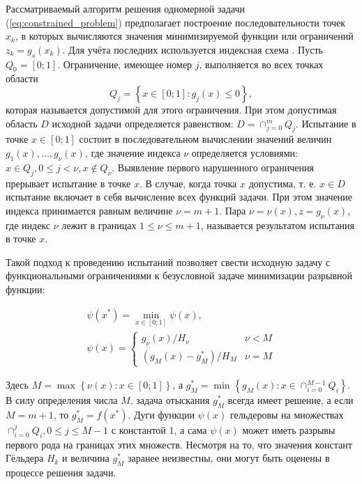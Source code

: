 Рассматриваемый алгоритм решения одномерной задачи (\ref{eq:constrained_problem}) предполагает построение последовательности
точек \(x_k\), в которых вычисляются значения минимизируемой функции или ограничений \(z_k = g_s(x_k)\).
Для учёта последних используется индексная схема \cite{strongSerg}. Пусть \(Q_0=[0;1]\). Ограничение, имеющее номер
 \(j\), выполняется во всех точках области
\begin{displaymath}
  Q_j=\left\{x\in [0;1]:g_j(x)\leq 0\right\},
\end{displaymath}
которая называется допустимой для этого ограничения. При этом допустимая область \(D\)
исходной задачи определяется равенством: \(D=\cap _{j=0}^{m}Q_{j}\).
Испытание в точке \(x\in [0;1]\) состоит в последовательном вычислении значений
величин \(g_{1}(x),...,g_{\nu }(x)\), где значение индекса \(\nu\) определяется условиями:
\(x\in Q_{j},0\leqslant j<\nu ,x\notin Q_{\nu }\). Выявление первого нарушенного ограничения
прерывает испытание в точке \(x\). В случае, когда точка \(x\)  допустима, т. е.
\(x\in D\) испытание включает в себя вычисление всех функций задачи. При этом значение
индекса принимается равным величине \(\nu =m+1\). Пара \(\nu =\nu (x),z=g_{\nu }(x)\),
где индекс \(\nu\) лежит в границах \(1\leqslant \nu \leqslant m+1\), называется результатом
испытания в точке \(x\).

Такой подход к проведению испытаний позволяет свести исходную задачу с функциональными
ограничениями к безусловной задаче минимизации разрывной функции:

\begin{displaymath}
  \begin{array}{lr}
    \psi (x^{*})=\min_{x\in [0;1]}\psi (x), \\
    \psi (x)={\begin{cases}g_{\nu }(x)/H_{\nu }&\nu <M\\(g_{M}(x)-g_{M}^{*})/H_{M}&\nu =M\end{cases}}
  \end{array}
\end{displaymath}

Здесь \(M=\max_{}^{}\left\{\nu (x):x\in [0;1]\right\}\), а \(g_{M}^{*}=\min _{}^{}\left\{g_{M}(x):x\in \cap _{i=0}^{M-1}Q_{i}\right\}\).
В силу определения числа \(M\), задача отыскания \(g_{M}^{*}\)
всегда имеет решение, а если \(M=m+1\), то \(g_{M}^{*}=f(x^{*})\).
Дуги функции \(\psi (x)\) гельдеровы на множествах \(\cap _{i=0}^{j}Q_{i},0\leq j\leq M-1\)
с константой 1, а сама \(\psi (x)\) может иметь разрывы первого рода на границах этих множеств.
Несмотря на то, что значения констант Гёльдера \(H_k\) и величина \(g_{M}^{*}\) заранее неизвестны,
они могут быть оценены в процессе решения задачи.

